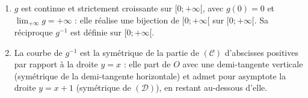 \begin{corrige}
\begin{sol}
\begin{enumerate}
\begin{enumerate}
      \item $g$ est continue et strictement croissante sur $[0;+\infty[$, avec $g(0) = 0$ et $\lim_{+\infty} g = +\infty$ :
            elle r\'ealise une bijection de $[0;+\infty[$ sur $[0;+\infty[$. Sa r\'eciproque $g^{-1}$ est d\'efinie sur $[0;+\infty[$.
      \item La courbe de $g^{-1}$ est la sym\'etrique de la partie de $(\mathscr{C})$ d'abscisses positives par rapport \`a la droite $y = x$ :
            elle part de $O$ avec une demi-tangente verticale (sym\'etrique de la demi-tangente horizontale) et admet pour asymptote
            la droite $y = x + 1$ (sym\'etrique de $(\mathcal{D})$), en restant au-dessous d'elle.
      \end{enumerate}
\end{enumerate}
\end{sol}


\end{corrige}
